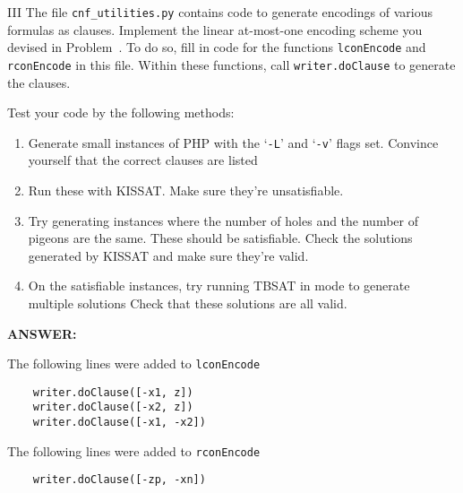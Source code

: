 \snewpage

\begin{problem}{III}
The file
\texttt{cnf\_utilities.py} contains code
to generate encodings of various formulas as clauses.
Implement the linear at-most-one encoding scheme you devised in
Problem~.  To do so, fill in code for the functions
\texttt{lconEncode} and \texttt{rconEncode} in this file.
Within these functions, call
\texttt{writer.doClause} to generate the clauses.

Test your code by the following methods:
\begin{enumerate}
\item
Generate small instances of PHP with the `\texttt{-L}' and
`\texttt{-v}' flags set.  Convince yourself that the correct clauses are listed
\item
  Run these with KISSAT. Make sure they're unsatisfiable.
\item
  Try generating instances where the number of holes and the number of
  pigeons are the same.  These should be satisfiable.  Check the
  solutions generated by KISSAT and make sure they're valid.
\item
  On the satisfiable instances, try running TBSAT in mode to generate multiple solutions
  Check that these solutions are all valid.
\end{enumerate}
\ifshowsolutions
{\bf ANSWER:}

The following lines were added to \texttt{lconEncode}
\begin{lstlisting}
    writer.doClause([-x1, z])
    writer.doClause([-x2, z])
    writer.doClause([-x1, -x2])
\end{lstlisting}
The following lines were added to \texttt{rconEncode}
\begin{lstlisting}
    writer.doClause([-zp, -xn])
\end{lstlisting}
\fi

\end{problem}

\newpage

